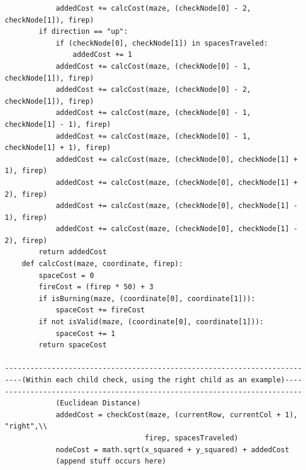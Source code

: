 \documentclass[11pt]{article}
\begin{document}
\begin{verbatim}
            addedCost += calcCost(maze, (checkNode[0] - 2, checkNode[1]), firep)
        if direction == "up":
            if (checkNode[0], checkNode[1]) in spacesTraveled:
                addedCost += 1
            addedCost += calcCost(maze, (checkNode[0] - 1, checkNode[1]), firep)
            addedCost += calcCost(maze, (checkNode[0] - 2, checkNode[1]), firep)
            addedCost += calcCost(maze, (checkNode[0] - 1, checkNode[1] - 1), firep)
            addedCost += calcCost(maze, (checkNode[0] - 1, checkNode[1] + 1), firep)
            addedCost += calcCost(maze, (checkNode[0], checkNode[1] + 1), firep)
            addedCost += calcCost(maze, (checkNode[0], checkNode[1] + 2), firep)
            addedCost += calcCost(maze, (checkNode[0], checkNode[1] - 1), firep)
            addedCost += calcCost(maze, (checkNode[0], checkNode[1] - 2), firep)
        return addedCost
    def calcCost(maze, coordinate, firep):
        spaceCost = 0
        fireCost = (firep * 50) + 3
        if isBurning(maze, (coordinate[0], coordinate[1])):
            spaceCost += fireCost
        if not isValid(maze, (coordinate[0], coordinate[1])):
            spaceCost += 1
        return spaceCost
        
----------------------------------------------------------------------
----(Within each child check, using the right child as an example)----
----------------------------------------------------------------------
			(Euclidean Distance)
            addedCost = checkCost(maze, (currentRow, currentCol + 1), "right",\\
                                 firep, spacesTraveled)
            nodeCost = math.sqrt(x_squared + y_squared) + addedCost
			(append stuff occurs here)
\end{verbatim}
\end{document}
